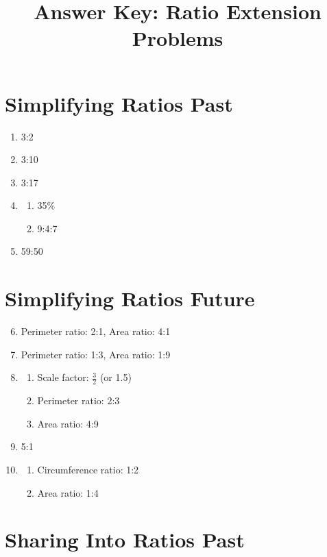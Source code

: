 \documentclass[12pt,a4paper]{article}
\title{Answer Key: Ratio Extension Problems}
\date{}
\begin{document}
\maketitle

\section*{Simplifying Ratios Past}

\begin{enumerate}
    \item 3:2
    \item 3:10
    \item 3:17
    \item \begin{enumerate}
        \item 35\%
        \item 9:4:7
    \end{enumerate}
    \item 59:50
\end{enumerate}

\section*{Simplifying Ratios Future}

\begin{enumerate}
    \setcounter{enumi}{5}
    \item Perimeter ratio: 2:1, Area ratio: 4:1
    \item Perimeter ratio: 1:3, Area ratio: 1:9
    \item \begin{enumerate}
        \item Scale factor: \( \frac{3}{2} \) (or 1.5)
        \item Perimeter ratio: 2:3
        \item Area ratio: 4:9
    \end{enumerate}
    \item 5:1
    \item \begin{enumerate}
        \item Circumference ratio: 1:2
        \item Area ratio: 1:4
    \end{enumerate}
\end{enumerate}

\section*{Sharing Into Ratios Past}
\end{document}
